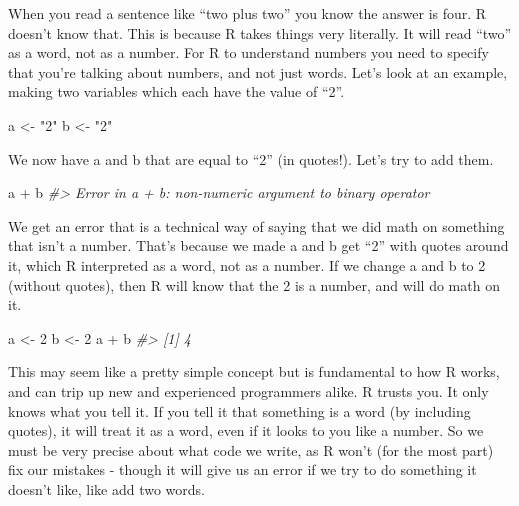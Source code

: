 \documentclass[
]{krantz}
\makeatletter
\newenvironment{Shaded}{\begin{snugshade}}{\end{snugshade}}
\newcommand{\CommentTok}[1]{\textcolor[rgb]{0.37,0.37,0.37}{\textit{#1}}}
\newcommand{\DecValTok}[1]{\textcolor[rgb]{0.06,0.06,0.06}{#1}}
\newcommand{\NormalTok}[1]{#1}
\newcommand{\OtherTok}[1]{\textcolor[rgb]{0.37,0.37,0.37}{#1}}
\newcommand{\SpecialCharTok}[1]{\textcolor[rgb]{0,0,0}{#1}}
\newcommand{\StringTok}[1]{\textcolor[rgb]{0.5,0.5,0.5}{#1}}
\newenvironment{kframe}{%
\medskip{}
\setlength{\fboxsep}{.8em}
 \def\at@end@of@kframe{}%
 \ifinner\ifhmode%
  \def\at@end@of@kframe{\end{minipage}}%
  \begin{minipage}{\columnwidth}%
 \fi\fi%
 \def\FrameCommand##1{\hskip\@totalleftmargin \hskip-\fboxsep
 \colorbox{shadecolor}{##1}\hskip-\fboxsep
     \hskip-\linewidth \hskip-\@totalleftmargin \hskip\columnwidth}%
 \MakeFramed {\advance\hsize-\width
   \@totalleftmargin\z@ \linewidth\hsize
   \@setminipage}}%
 {\par\unskip\endMakeFramed%
 \at@end@of@kframe}
\renewenvironment{Shaded}{\begin{kframe}}{\end{kframe}}
\makeatother
\begin{document}
When you read a sentence like ``two plus two'' you know the
answer is four. R doesn't know that. This is because R takes
things very literally. It will read ``two'' as a word, not
as a number. For R to understand numbers you need to specify
that you're talking about numbers, and not just words. Let's
look at an example, making two variables which each have the
value of ``2''.

\begin{Shaded}
\begin{Highlighting}[]
\NormalTok{a }\OtherTok{\textless{}{-}} \StringTok{"2"}
\NormalTok{b }\OtherTok{\textless{}{-}} \StringTok{"2"}
\end{Highlighting}
\end{Shaded}

We now have a and b that are equal to ``2'' (in quotes!).
Let's try to add them.

\begin{Shaded}
\begin{Highlighting}[]
\NormalTok{a }\SpecialCharTok{+}\NormalTok{ b}
\CommentTok{\#\textgreater{} Error in a + b: non{-}numeric argument to binary operator}
\end{Highlighting}
\end{Shaded}

We get an error that is a technical way of saying that we
did math on something that isn't a number. That's because we
made a and b get ``2'' with quotes around it, which R
interpreted as a word, not as a number. If we change a and b
to 2 (without quotes), then R will know that the 2 is a
number, and will do math on it.

\begin{Shaded}
\begin{Highlighting}[]
\NormalTok{a }\OtherTok{\textless{}{-}} \DecValTok{2}
\NormalTok{b }\OtherTok{\textless{}{-}} \DecValTok{2}
\NormalTok{a }\SpecialCharTok{+}\NormalTok{ b}
\CommentTok{\#\textgreater{} [1] 4}
\end{Highlighting}
\end{Shaded}

This may seem like a pretty simple concept but is
fundamental to how R works, and can trip up new and
experienced programmers alike. R trusts you. It only knows
what you tell it. If you tell it that something is a word
(by including quotes), it will treat it as a word, even if
it looks to you like a number. So we must be very precise
about what code we write, as R won't (for the most part) fix
our mistakes - though it will give us an error if we try to
do something it doesn't like, like add two words.
\end{document}
